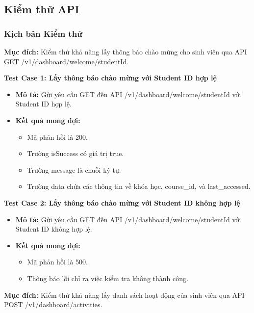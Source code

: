 \subsection{Kiểm thử API}

\subsubsection{Kịch bản Kiểm thử}


\textbf{Mục đích:} Kiểm thử khả năng lấy thông báo chào mừng cho sinh viên qua API GET /v1/dashboard/welcome/{studentId}.

\textbf{Test Case 1: Lấy thông báo chào mừng với Student ID hợp lệ}
\begin{itemize}
    \item \textbf{Mô tả:} Gửi yêu cầu GET đến API /v1/dashboard/welcome/{studentId} với Student ID hợp lệ.
    \item \textbf{Kết quả mong đợi:}
    \begin{itemize}
        \item Mã phản hồi là 200.
        \item Trường isSuccess có giá trị true.
        \item Trường message là chuỗi ký tự.
        \item Trường data chứa các thông tin về khóa học, course\_id, và last\_accessed.
    \end{itemize}
\end{itemize}

\textbf{Test Case 2: Lấy thông báo chào mừng với Student ID không hợp lệ}
\begin{itemize}
    \item \textbf{Mô tả:} Gửi yêu cầu GET đến API /v1/dashboard/welcome/{studentId} với Student ID không hợp lệ.
    \item \textbf{Kết quả mong đợi:}
    \begin{itemize}
        \item Mã phản hồi là 500.
        \item Thông báo lỗi chỉ ra việc kiểm tra không thành công.
    \end{itemize}
\end{itemize}


\textbf{Mục đích:} Kiểm thử khả năng lấy danh sách hoạt động của sinh viên qua API POST /v1/dashboard/activities.

